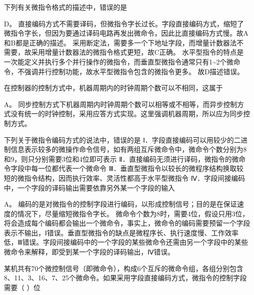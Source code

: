\question 下列有关微指令格式的描述中，错误的是
\par{}
\begin{solution}D。
直接编码方式不需要译码，但微指令字长过长。字段直接编码方式，缩短了微指令字长，但因为要通过译码电路再发出微命令，因此比直接编码方式慢。故A和B都是正确的描述。
采用断定法，需要多一个下地址字段，而增量计数器法不需要，故采用增量计数器法的微指令格式更短，故C正确。
水平型指令的特点是一次能定义并执行多个并行操作的微指令，而垂直型微指令通常只有1\textasciitilde{}2个微命令，不强调并行控制功能，故水平型微指令包含的微指令更多。
故D描述错误。
\end{solution}
\question 在控制器的控制方式中，机器周期内的时钟周期个数可以不相同，这属于
\par{}
\begin{solution}A。
同步控制方式下机器周期内时钟周期个数可以相等或不相等，而异步控制方式没有统一的时钟控制，采用应答方式实现。这里强调机器周期，所以应为同步控制方式。
\end{solution}
\question 下列关于微指令编码方式的说法中，错误的是
Ⅰ．字段直接编码可以用较少的二进制信息表示较多的微操作命令信号，如有两组互斥微命令中，微命令个数分别为8和9，则只分别需要3位和4位即可表示
Ⅱ．直接编码无须进行译码，微指令的微命令字段中每一位都代表一个微命令
Ⅲ．垂直型微指令以较长的微程序结构换取较短的微指令结构，因而执行效率、灵活性都高于水平型微指令
Ⅳ．字段间接编码中，一个字段的译码输出需要依靠另外某一个字段的输入
\par{}
\begin{solution}A。
编码的是对微指令的控制字段进行编码，以形成控制信号；目的是在保证速度的情况下，尽量缩短微指令字长。
微命令个数为8时，需要4位，假设只用3位，将会造成每个编码都会输出一个微命令，事实上，微命令的编码需要预留一个字段表示不输出，Ⅰ错误。垂直型微指令的缺点是微程序长、执行速度慢、工作效率低，Ⅲ错误。字段间接编码中的一个字段的某些微命令还需由另一个字段中的某些微命令来解释，即受到某一个字段的译码输出，Ⅳ错误。
\end{solution}
\question 某机共有70个微控制信号（即微命令），构成6个互斥的微命令组，各组分别包含8、11、3、16、7、25个微命令。如果采用字段直接编码方式，微指令的控制字段需要（
）位
\par{}
